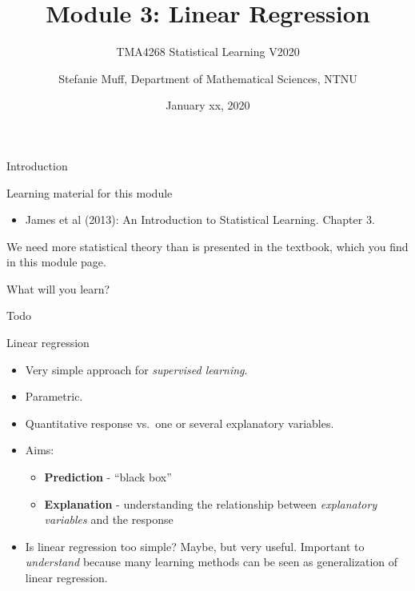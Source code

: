 \documentclass[10pt,ignorenonframetext,]{beamer}
\title{Module 3: Linear Regression}
\subtitle{TMA4268 Statistical Learning V2020}
\author{Stefanie Muff, Department of Mathematical Sciences, NTNU}
\date{January xx, 2020}
\providecommand{\tightlist}{%
  \setlength{\itemsep}{0pt}\setlength{\parskip}{0pt}}
\begin{document}
\frame{\titlepage}

\begin{frame}{Introduction}

\begin{block}{Learning material for this module}

\begin{itemize}
\tightlist
\item
  James et al (2013): An Introduction to Statistical Learning. Chapter
  3.
\end{itemize}

We need more statistical theory than is presented in the textbook, which
you find in this module page.

\end{block}

\end{frame}

\begin{frame}

\begin{block}{What will you learn?}

Todo

\end{block}

\end{frame}

\begin{frame}{Linear regression}

\begin{itemize}
\item
  Very simple approach for \emph{supervised learning}.
\item
  Parametric.
\item
  Quantitative response vs.~one or several explanatory variables.
\item
  Aims:

  \begin{itemize}
  \tightlist
  \item
    \textbf{Prediction} - ``black box''
  \item
    \textbf{Explanation} - understanding the relationship between
    \emph{explanatory variables} and the response
  \end{itemize}
\item
  Is linear regression too simple? Maybe, but very useful. Important to
  \emph{understand} because many learning methods can be seen as
  generalization of linear regression.
\end{itemize}

\end{frame}
\end{document}
